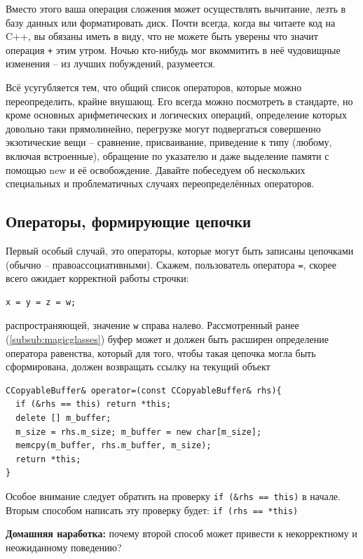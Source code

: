 \documentclass[a4paper,12pt,oneside]{book}
\begin{document}
Вместо этого ваша операция сложения может осуществлять вычитание, лезть в базу данных или форматировать диск. Почти всегда, когда вы читаете код на C++, вы обязаны иметь в виду, что не можете быть уверены что значит операция \lstinline!+! этим утром. Ночью кто-нибудь мог вкоммитить в неё чудовищные изменения – из лучших побуждений, разумеется.

Всё усугубляется тем, что общий список операторов, которые можно переопределить, крайне внушающ. Его всегда можно посмотреть в стандарте, но кроме основных арифметических и логических операций, определение которых довольно таки прямолинейно, перегрузке могут подвергаться совершенно экзотические вещи – сравнение, присваивание, приведение к типу (любому, включая встроенные), обращение по указателю и даже выделение памяти с помощью new и её освобождение. Давайте побеседуем об нескольких специальных и проблематичных случаях переопределённых операторов.

\subsection{Операторы, формирующие цепочки}\label{ChainOps}

Первый особый случай, это операторы, которые могут быть записаны цепочками (обычно -- правоассоциативными). Скажем, пользователь оператора \lstinline!=!, скорее всего ожидает корректной работы строчки:

\begin{lstlisting}
x = y = z = w;
\end{lstlisting}

распространяющей, значение \lstinline!w! справа налево. Рассмотренный ранее (\ref{subsub:magicglasses}) буфер может и должен быть расширен определение оператора равенства, который для того, чтобы такая цепочка могла быть сформирована, должен возвращать ссылку на текущий объект

\begin{lstlisting}
CCopyableBuffer& operator=(const CCopyableBuffer& rhs){
  if (&rhs == this) return *this;
  delete [] m_buffer;
  m_size = rhs.m_size; m_buffer = new char[m_size];
  memcpy(m_buffer, rhs.m_buffer, m_size);
  return *this;
}
\end{lstlisting}

Особое внимание следует обратить на проверку \lstinline!if (&rhs == this)! в начале. Вторым способом написать эту проверку будет: \lstinline!if (rhs == *this)!

\textbf{Домашняя наработка:} почему второй способ может привести к некорректному и неожиданному поведению?
\end{document}
